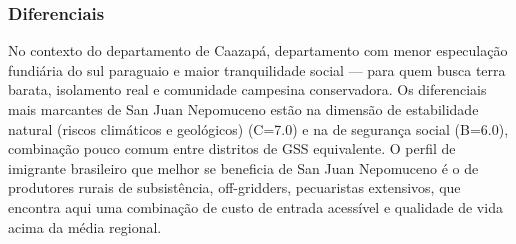 \subsubsection*{Diferenciais}\label{dif-san-juan-nepomuceno-0607}
No contexto do departamento de Caazapá, departamento com menor especulação fundiária do sul paraguaio e maior tranquilidade social — para quem busca terra barata, isolamento real e comunidade campesina conservadora. Os diferenciais mais marcantes de San Juan Nepomuceno estão na dimensão de estabilidade natural (riscos climáticos e geológicos) (C=7.0) e na de segurança social (B=6.0), combinação pouco comum entre distritos de GSS equivalente. O perfil de imigrante brasileiro que melhor se beneficia de San Juan Nepomuceno é o de produtores rurais de subsistência, off-gridders, pecuaristas extensivos, que encontra aqui uma combinação de custo de entrada acessível e qualidade de vida acima da média regional.
